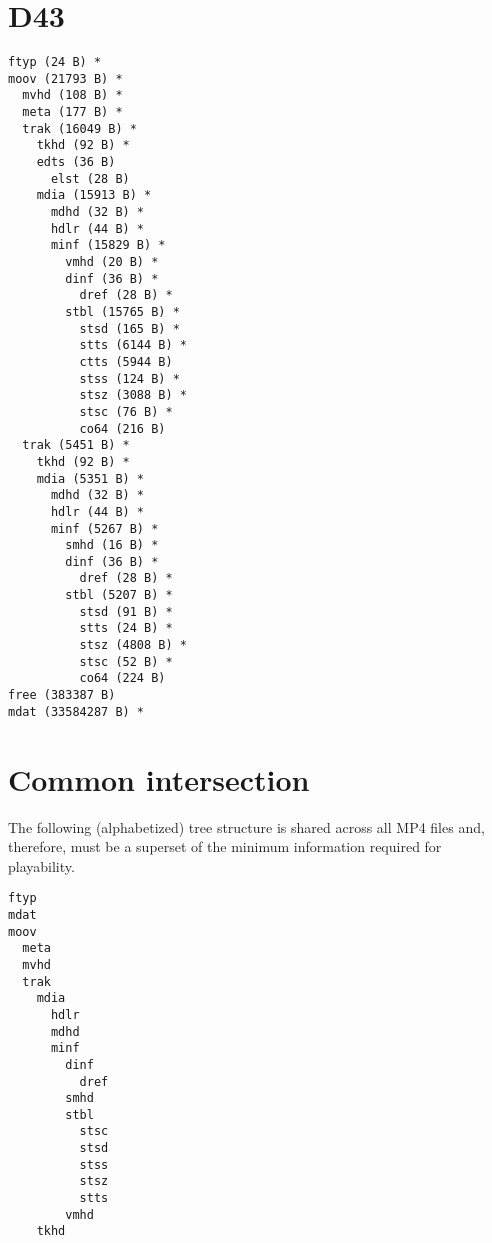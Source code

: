 \section{D43}

\begin{lstlisting}
ftyp (24 B) *
moov (21793 B) *
  mvhd (108 B) *
  meta (177 B) *
  trak (16049 B) *
    tkhd (92 B) *
    edts (36 B)
      elst (28 B)
    mdia (15913 B) *
      mdhd (32 B) *
      hdlr (44 B) *
      minf (15829 B) *
        vmhd (20 B) *
        dinf (36 B) *
          dref (28 B) *
        stbl (15765 B) *
          stsd (165 B) *
          stts (6144 B) *
          ctts (5944 B)
          stss (124 B) *
          stsz (3088 B) *
          stsc (76 B) *
          co64 (216 B)
  trak (5451 B) *
    tkhd (92 B) *
    mdia (5351 B) *
      mdhd (32 B) *
      hdlr (44 B) *
      minf (5267 B) *
        smhd (16 B) *
        dinf (36 B) *
          dref (28 B) *
        stbl (5207 B) *
          stsd (91 B) *
          stts (24 B) *
          stsz (4808 B) *
          stsc (52 B) *
          co64 (224 B)
free (383387 B)
mdat (33584287 B) *
\end{lstlisting}

\section{Common intersection}

The following (alphabetized) tree structure is shared across all MP4 files and, therefore, must be a superset of the minimum information required for playability.

\begin{lstlisting}
ftyp
mdat
moov
  meta
  mvhd
  trak
    mdia
      hdlr
      mdhd
      minf
        dinf
          dref
        smhd
        stbl
          stsc
          stsd
          stss
          stsz
          stts
        vmhd
    tkhd
\end{lstlisting}

\pagebreak{}
